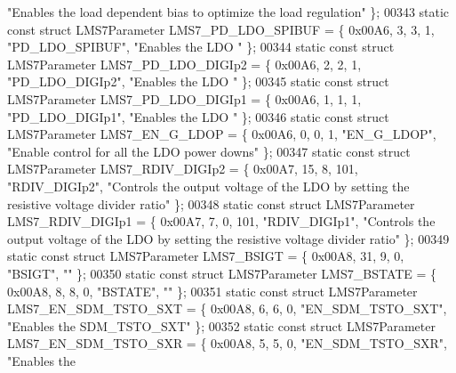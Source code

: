 \begin{DoxyCode}
{      "Enables the load dependent bias to optimize the load regulation"} \};
00343 \textcolor{keyword}{static} \textcolor{keyword}{const} \textcolor{keyword}{struct }LMS7Parameter LMS7_PD_LDO_SPIBUF = \{ 0x00A6, 3, 3, 1, \textcolor{stringliteral}{"PD\_LDO\_SPIBUF"}, \textcolor{stringliteral}{"Enables the LDO
      "} \};
00344 \textcolor{keyword}{static} \textcolor{keyword}{const} \textcolor{keyword}{struct }LMS7Parameter LMS7_PD_LDO_DIGIp2 = \{ 0x00A6, 2, 2, 1, \textcolor{stringliteral}{"PD\_LDO\_DIGIp2"}, \textcolor{stringliteral}{"Enables the LDO
      "} \};
00345 \textcolor{keyword}{static} \textcolor{keyword}{const} \textcolor{keyword}{struct }LMS7Parameter LMS7_PD_LDO_DIGIp1 = \{ 0x00A6, 1, 1, 1, \textcolor{stringliteral}{"PD\_LDO\_DIGIp1"}, \textcolor{stringliteral}{"Enables the LDO
      "} \};
00346 \textcolor{keyword}{static} \textcolor{keyword}{const} \textcolor{keyword}{struct }LMS7Parameter LMS7_EN_G_LDOP = \{ 0x00A6, 0, 0, 1, \textcolor{stringliteral}{"EN\_G\_LDOP"}, \textcolor{stringliteral}{"Enable control for all
       the LDO power downs"} \};
00347 \textcolor{keyword}{static} \textcolor{keyword}{const} \textcolor{keyword}{struct }LMS7Parameter LMS7_RDIV_DIGIp2 = \{ 0x00A7, 15, 8, 101, \textcolor{stringliteral}{"RDIV\_DIGIp2"}, \textcolor{stringliteral}{"Controls the
       output voltage of the LDO by setting the resistive voltage divider ratio"} \};
00348 \textcolor{keyword}{static} \textcolor{keyword}{const} \textcolor{keyword}{struct }LMS7Parameter LMS7_RDIV_DIGIp1 = \{ 0x00A7, 7, 0, 101, \textcolor{stringliteral}{"RDIV\_DIGIp1"}, \textcolor{stringliteral}{"Controls the
       output voltage of the LDO by setting the resistive voltage divider ratio"} \};
00349 \textcolor{keyword}{static} \textcolor{keyword}{const} \textcolor{keyword}{struct }LMS7Parameter LMS7_BSIGT = \{ 0x00A8, 31, 9, 0, \textcolor{stringliteral}{"BSIGT"}, \textcolor{stringliteral}{""} \};
00350 \textcolor{keyword}{static} \textcolor{keyword}{const} \textcolor{keyword}{struct }LMS7Parameter LMS7_BSTATE = \{ 0x00A8, 8, 8, 0, \textcolor{stringliteral}{"BSTATE"}, \textcolor{stringliteral}{""} \};
00351 \textcolor{keyword}{static} \textcolor{keyword}{const} \textcolor{keyword}{struct }LMS7Parameter LMS7_EN_SDM_TSTO_SXT = \{ 0x00A8, 6, 6, 0, \textcolor{stringliteral}{"EN\_SDM\_TSTO\_SXT"}, \textcolor{stringliteral}{"Enables the
       SDM\_TSTO\_SXT"} \};
00352 \textcolor{keyword}{static} \textcolor{keyword}{const} \textcolor{keyword}{struct }LMS7Parameter LMS7_EN_SDM_TSTO_SXR = \{ 0x00A8, 5, 5, 0, \textcolor{stringliteral}{"EN\_SDM\_TSTO\_SXR"}, \textcolor{stringliteral}{"Enables the
}
\end{DoxyCode}
